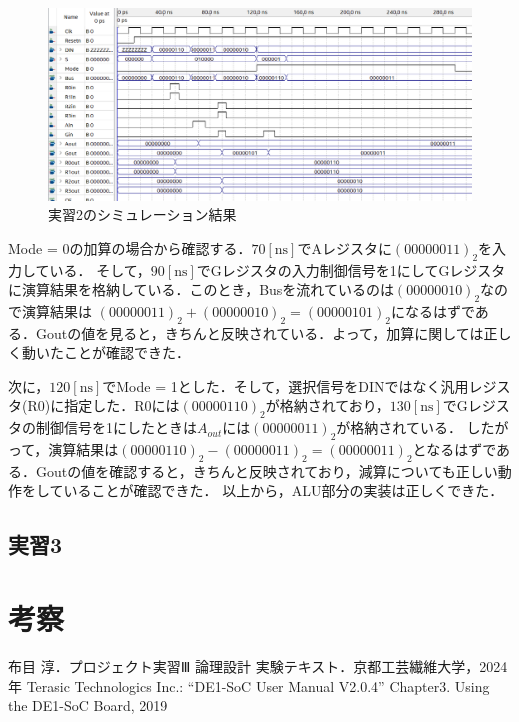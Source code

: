 \documentclass{jlreq}
\numberwithin{equation}{section}
\begin{document}
\begin{figure}[H]
	\centering
	\includegraphics[width=\textwidth]{assets/jisshu2_sim.png}
	\caption{実習2のシミュレーション結果}
	\label{fig:jisshu2_sim}
\end{figure}

Mode = 0の加算の場合から確認する．$70[\si{\ns}]$でAレジスタに$(00000011)_{2}$を入力している．
そして，$90[\si{\ns}]$でGレジスタの入力制御信号を1にしてGレジスタに演算結果を格納している．このとき，Busを流れているのは$(00000010)_2$なので演算結果は
$(00000011)_{2} + (00000010)_2 = (00000101)_2$になるはずである．Goutの値を見ると，きちんと反映されている．よって，加算に関しては正しく動いたことが確認できた．

次に，$120[\si{\ns}]$でMode = 1とした．そして，選択信号をDINではなく汎用レジスタ(R0)に指定した．R0には$(00000110)_2$が格納されており，$130[\si{\ns}]$でGレジスタの制御信号を1にしたときは$A_{out}$には$(00000011)_2$が格納されている．
したがって，演算結果は$(00000110)_2 - (00000011)_2 = (00000011)_2$となるはずである．Goutの値を確認すると，きちんと反映されており，減算についても正しい動作をしていることが確認できた．
以上から，ALU部分の実装は正しくできた．

\subsection{実習3}

\section{考察}

\begin{thebibliography}{9}
	 布目 淳．プロジェクト実習Ⅲ 論理設計 実験テキスト．京都工芸繊維大学，2024年
	 Terasic Technologics Inc.:  ``DE1-SoC User Manual V2.0.4'' Chapter3. Using the DE1-SoC Board, 2019
\end{thebibliography}
\end{document}
